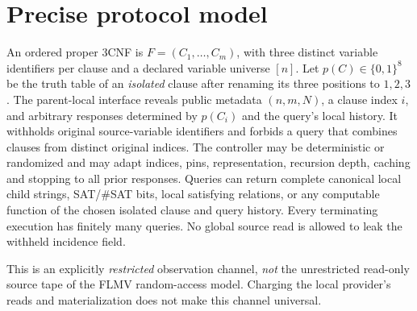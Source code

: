 \documentclass[11pt]{article}
\begin{document}
\section*{Precise protocol model}
An ordered proper 3CNF is \(F=(C_1,\ldots,C_m)\), with three distinct variable identifiers per clause and a declared variable universe \([n]\). Let \(p(C)\in\{0,1\}^8\) be the truth table of an \emph{isolated} clause after renaming its three positions to \(1,2,3\). The parent-local interface reveals public metadata \((n,m,N)\), a clause index \(i\), and arbitrary responses determined by \(p(C_i)\) and the query's local history. It withholds original source-variable identifiers and forbids a query that combines clauses from distinct original indices. The controller may be deterministic or randomized and may adapt indices, pins, representation, recursion depth, caching and stopping to all prior responses. Queries can return complete canonical local child strings, SAT/\#SAT bits, local satisfying relations, or any computable function of the chosen isolated clause and query history. Every terminating execution has finitely many queries. No global source read is allowed to leak the withheld incidence field.

This is an explicitly \emph{restricted} observation channel, \emph{not} the unrestricted read-only source tape of the FLMV random-access model. Charging the local provider's reads and materialization does not make this channel universal.
\end{document}
